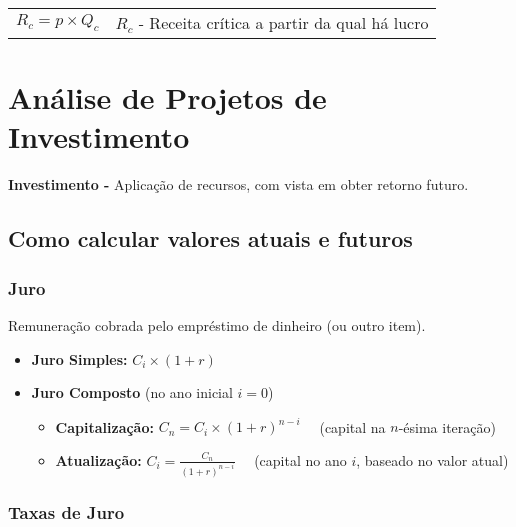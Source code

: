 \documentclass[11pt]{article}
\begin{document}
\begin{tabular}{ c c }
    \begin{minipage}{0.45\textwidth}
        \begin{equation*}
            R_c = p \times Q_c
        \end{equation*}
    \end{minipage} &
    \begin{minipage}{0.45\textwidth}
        $R_c$ - Receita crítica a partir da qual há lucro
    \end{minipage}
\end{tabular}

\newpage

\section{Análise de Projetos de Investimento}

\textbf{Investimento -} Aplicação de recursos, com vista em obter retorno futuro.

\subsection{Como calcular valores atuais e futuros}

\subsubsection{Juro}

Remuneração cobrada pelo empréstimo de dinheiro (ou outro item).
\begin{itemize}[topsep=0pt]
    \item \textbf{Juro Simples: }$C_i\times (1+r)$
    \item \textbf{Juro Composto} (no ano inicial $i=0$)
          \begin{itemize}
              \item \textbf{Capitalização: }$C_n=C_i\times(1+r)^{n-i}$
                    \ \ (capital na $n$-ésima iteração)
              \item \textbf{Atualização: }$\displaystyle C_i=\frac{C_n}{(1+r)^{n-i}}$
                    \ \ (capital no ano $i$, baseado no valor atual)
          \end{itemize}
\end{itemize}

\subsubsection{Taxas de Juro}
\end{document}
